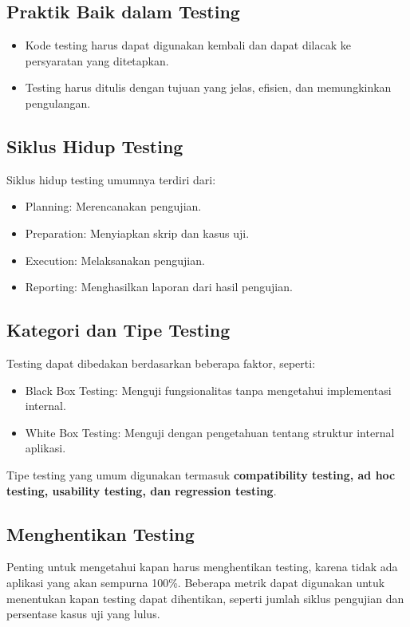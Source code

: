 \documentclass{article}
\begin{document}
\subsection{Praktik Baik dalam Testing}
\begin{itemize}
    \item Kode testing harus dapat digunakan kembali dan dapat dilacak ke persyaratan yang ditetapkan.
    \item Testing harus ditulis dengan tujuan yang jelas, efisien, dan memungkinkan pengulangan.
\end{itemize}

\subsection{Siklus Hidup Testing}
Siklus hidup testing umumnya terdiri dari:
\begin{itemize}
    \item Planning: Merencanakan pengujian.
    \item Preparation: Menyiapkan skrip dan kasus uji.
    \item Execution: Melaksanakan pengujian.
    \item Reporting: Menghasilkan laporan dari hasil pengujian.
\end{itemize}

\subsection{Kategori dan Tipe Testing}
Testing dapat dibedakan berdasarkan beberapa faktor, seperti:
\begin{itemize}
    \item Black Box Testing: Menguji fungsionalitas tanpa mengetahui implementasi internal.
    \item White Box Testing: Menguji dengan pengetahuan tentang struktur internal aplikasi.
\end{itemize}
Tipe testing yang umum digunakan termasuk \textbf{compatibility testing, ad hoc testing, usability testing, dan regression testing}.

\subsection{Menghentikan Testing}
Penting untuk mengetahui kapan harus menghentikan testing, karena tidak ada aplikasi yang akan sempurna 100\%. Beberapa metrik dapat digunakan untuk menentukan kapan testing dapat dihentikan, seperti jumlah siklus pengujian dan persentase kasus uji yang lulus.
\end{document}
